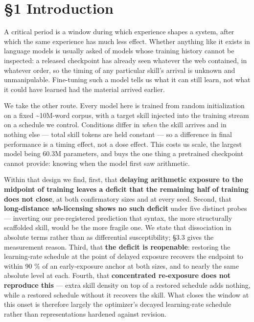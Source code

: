 \documentclass{article}
\begin{document}
\section{§1 Introduction}\label{introduction}

A critical period is a window during which experience shapes a system, after which the same
experience has much less effect. Whether anything like it exists in language models is
usually asked of models whose training history cannot be inspected: a released checkpoint
has already seen whatever the web contained, in whatever order, so the timing of any
particular skill's arrival is unknown and unmanipulable. Fine-tuning such a model tells us
what it can still learn, not what it could have learned had the material arrived earlier.

We take the other route. Every model here is trained from random initialization on a fixed
\textasciitilde10M-word corpus, with a target skill injected into the training stream on a schedule we
control. Conditions differ in \emph{when} the skill arrives and in nothing else --- total skill
tokens are held constant --- so a difference in final performance is a timing effect, not a
dose effect. This costs us scale, the largest model being 60.3M parameters, and buys the one
thing a pretrained checkpoint cannot provide: knowing when the model first saw arithmetic.

Within that design we find, first, that \textbf{delaying arithmetic exposure to the midpoint of
training leaves a deficit that the remaining half of training does not close}, at both
confirmatory sizes and at every seed. Second, that \textbf{long-distance \emph{wh}-licensing shows no
such deficit} under five distinct probes --- inverting our pre-registered prediction that
syntax, the more structurally scaffolded skill, would be the more fragile one. We state that
dissociation in absolute terms rather than as differential susceptibility; §3.3 gives the
measurement reason. Third, that \textbf{the deficit is reopenable}: restoring the learning-rate
schedule at the point of delayed exposure recovers the endpoint to within 90 \% of an
early-exposure anchor at both sizes, and to nearly the same absolute level at each. Fourth,
that \textbf{concentrated re-exposure does not reproduce this} --- extra skill density on top of a
restored schedule adds nothing, while a restored schedule without it recovers the skill.
What closes the window at this onset is therefore largely the optimizer's decayed
learning-rate schedule rather than representations hardened against revision.
\end{document}
